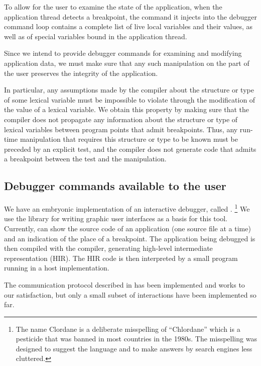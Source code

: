 To allow for the user to examine the state of the
application, when the application thread detects a breakpoint, the
command it injects into the debugger command loop contains a complete
list of live local variables and their values, as well as of special
variables bound in the application thread.

Since we intend to provide debugger commands for examining and
modifying application data, we must make sure that any such
manipulation on the part of the user preserves the integrity of the
application.

In particular, any assumptions made by the compiler about the
structure or type of some lexical variable must be impossible to
violate through the modification of the value of a lexical variable.
We obtain this property by making sure that the compiler does not
propagate any information about the structure or type of lexical
variables between program points that admit breakpoints.  Thus, any
run-time manipulation that requires this structure or type to be known
must be preceded by an explicit test, and the compiler does not
generate code that admits a breakpoint between the test and the
manipulation.

\subsection{Debugger commands available to the user}

We have an embryonic implementation of an interactive debugger, called
\clordane{}.%
\footnote{The name Clordane is a deliberate misspelling of
  ``Chlordane'' which is a pesticide that was banned in most countries
  in the 1980s.  The misspelling was designed to suggest the
  \commonlisp{} language and to make answers by search engines less
  cluttered.}
We use the \mcclim{} library for writing graphic user
interfaces as a basis for this tool.  Currently, \clordane{} can show
the source code of an application (one source file at a time) and an
indication of the place of a breakpoint.  The application being
debugged is then compiled with the \sicl{} compiler, generating
high-level intermediate representation (HIR).  The HIR code is then
interpreted by a small program running in a host \commonlisp{}
implementation.

The communication protocol described in
 has been implemented
and works to our satisfaction, but only a small subset of interactions
have been implemented so far.

